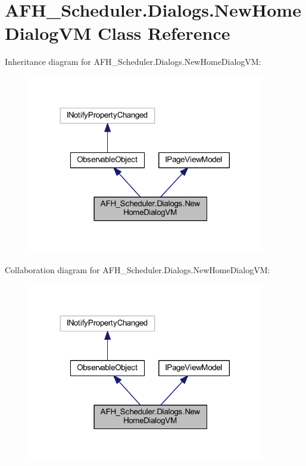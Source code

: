 \section{A\+F\+H\+\_\+\+Scheduler.\+Dialogs.\+New\+Home\+Dialog\+VM Class Reference}
\label{class_a_f_h___scheduler_1_1_dialogs_1_1_new_home_dialog_v_m}


Inheritance diagram for A\+F\+H\+\_\+\+Scheduler.\+Dialogs.\+New\+Home\+Dialog\+VM\+:
\nopagebreak
\begin{figure}[H]
\begin{center}
\leavevmode
\includegraphics[width=293pt]{class_a_f_h___scheduler_1_1_dialogs_1_1_new_home_dialog_v_m__inherit__graph}
\end{center}
\end{figure}


Collaboration diagram for A\+F\+H\+\_\+\+Scheduler.\+Dialogs.\+New\+Home\+Dialog\+VM\+:
\nopagebreak
\begin{figure}[H]
\begin{center}
\leavevmode
\includegraphics[width=293pt]{class_a_f_h___scheduler_1_1_dialogs_1_1_new_home_dialog_v_m__coll__graph}
\end{center}
\end{figure}
